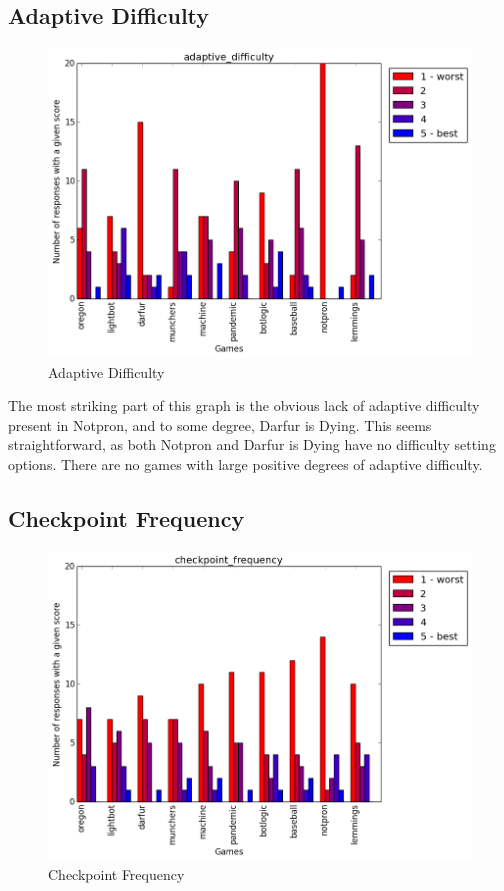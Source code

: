 			\subsection{Adaptive Difficulty}
				\begin{figure}[] 
				\centering 
				\includegraphics[width=\textwidth, height=.4\textheight, keepaspectratio=true]{adaptive_difficulty_scores.png} 
				\caption{Adaptive Difficulty}
				\end{figure}

				The most striking part of this graph is the obvious lack of adaptive difficulty present in Notpron, and to some degree, Darfur is Dying. This seems straightforward, as both Notpron and Darfur is Dying have no difficulty setting options. There are no games with large positive degrees of adaptive difficulty.

			\subsection{Checkpoint Frequency}
				\begin{figure}[] 
				\centering 
				\includegraphics[width=\textwidth, height=.4\textheight, keepaspectratio=true]{checkpoint_frequency_scores.png} 
				\caption{Checkpoint Frequency}
				\end{figure}

